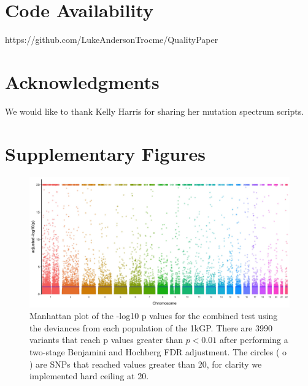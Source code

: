 \documentclass[9pt,lineno]{elife}
\begin{document}
\section{Code Availability}
https://github.com/LukeAndersonTrocme/QualityPaper

\section{Acknowledgments}
We would like to thank Kelly Harris for sharing her mutation spectrum scripts.



\clearpage
\section{Supplementary Figures}

\renewcommand{\thefigure}{S\arabic{figure}}
\setcounter{figure}{0}   	

\begin{figure}[h]
\includegraphics[width=\hsize,keepaspectratio]{./Figures/ManhattanPlot_adjusted.jpg}

\caption{Manhattan plot of the -log10 p values for the combined test using the deviances from each population of the 1kGP. 
There are 3990 variants that reach p values greater than $ p < 0.01$ after performing a two-stage Benjamini and Hochberg FDR adjustment. 
The circles ( o ) are SNPs that reached values greater than 20, for clarity we implemented hard ceiling at 20.}
  \label{Manhattan}
\end{figure}
\end{document}
